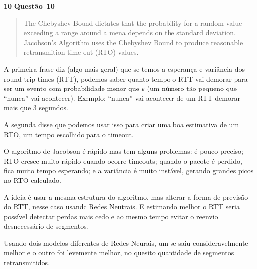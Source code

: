 \documentclass{article}
\newcounter{exe-list}
\newenvironment{exe-list}
    {\begin{list}{\alph{exe-list}.}{\usecounter{exe-list}}}
    {\end{list}}
\newenvironment{exe}[2][Problema]
    {\newcommand{\opt}{(Opcional)}%
    \newcommand{\sketch}[1]{{\bfseries Rascunho:} ##1}%
    \medskip\par\noindent\ifthenelse{\equal{#1}{}}
        {\textbf{\large #2}}
        {\textbf{\large #1~#2}}%
    \medskip\par\noindent}
    {\medskip}
\begin{document}
\begin{exe}[Questão]{10}
    \begin{exe-list}
    \item
        \begin{quote}
            The Chebyshev Bound dictates that
            the probability for a random value
            exceeding a range around a mena
            depends on the standard deviation.
            Jacobson's Algorithm uses the Chebyshev Bound
            to produce reasonable retransmition time-out (RTO) values.
        \end{quote}
        A primeira frase diz (algo mais geral) que
        se temos a esperança e variância
        dos round-trip times (RTT),
        podemos saber quanto tempo o RTT vai demorar
        para ser um evento com probabilidade menor que \(\varepsilon\)
        (um número tão pequeno que ``nunca'' vai acontecer).
        Exemplo: ``nunca'' vai acontecer de um RTT
        demorar mais que \(3\) segundos.

        A segunda disse que podemos usar isso
        para criar uma boa estimativa de um RTO,
        um tempo escolhido para o timeout.
    \item
        O algoritmo de Jacobson é rápido mas tem alguns problemas:
        é pouco preciso;
        RTO cresce muito rápido quando ocorre timeouts;
        quando o pacote é perdido, fica muito tempo esperando;
        e a variância é muito instável,
        gerando grandes picos no RTO calculado.

        A ideia é usar a mesma estrutura do algoritmo,
        mas alterar a forma de previsão do RTT,
        nesse caso usando Redes Neutrais.
        E estimando melhor o RTT seria possível
        detectar perdas mais cedo e
        ao mesmo tempo
        evitar o reenvio desnecessário de segmentos.

        Usando dois modelos diferentes de Redes Neurais,
        um se saiu consideravelmente melhor e
        o outro foi levemente melhor,
        no quesito quantidade de segmentos retransmitidos.
    \end{exe-list}
\end{exe}
\end{document}
